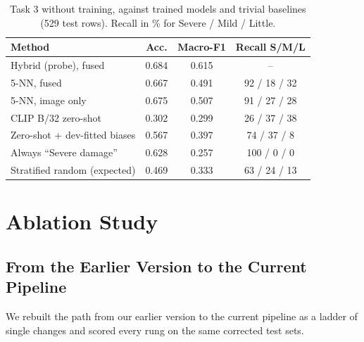 \documentclass[conference]{IEEEtran}
\begin{document}
\begin{table}[t]
\centering
\caption{Task 3 without training, against trained models and trivial baselines (529 test rows). Recall in \% for Severe / Mild / Little.}
\label{tab:zeroshot}
\footnotesize
\setlength{\tabcolsep}{3pt}
\begin{tabular}{lccc}
\toprule
Method & Acc. & Macro-F1 & Recall S/M/L \\
\midrule
Hybrid (probe), fused & 0.684 & 0.615 & -- \\
5-NN, fused & 0.667 & 0.491 & 92 / 18 / 32 \\
5-NN, image only & 0.675 & 0.507 & 91 / 27 / 28 \\
CLIP B/32 zero-shot & 0.302 & 0.299 & 26 / 37 / 38 \\
Zero-shot + dev-fitted biases & 0.567 & 0.397 & 74 / 37 / 8 \\
Always ``Severe damage'' & 0.628 & 0.257 & 100 / 0 / 0 \\
Stratified random (expected) & 0.469 & 0.333 & 63 / 24 / 13 \\
\bottomrule
\end{tabular}
\end{table}

\section{Ablation Study}
\label{sec:ablation}

\subsection{From the Earlier Version to the Current Pipeline}
\label{sec:ladder}
We rebuilt the path from our earlier version to the current pipeline as a ladder of single changes and scored every rung on the same corrected test sets.
\end{document}

